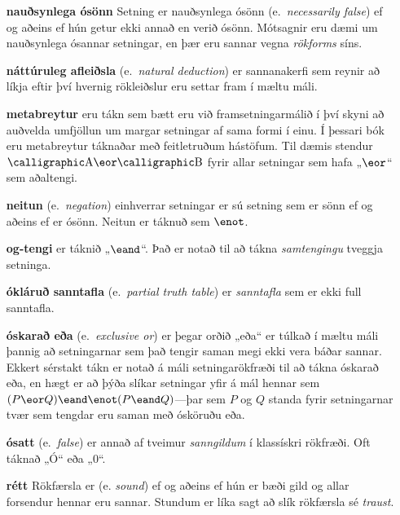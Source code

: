\begin{enumerate}[leftmargin=35pt]
	\item[\textbf{nauðsynlega ósönn}] Setning er nauðsynlega ósönn (e.\ \emph{necessarily false}) ef og aðeins ef hún getur ekki annað en verið ósönn. Mótsagnir eru dæmi um nauðsynlega ósannar setningar, en þær eru sannar vegna \emph{rökforms} síns.
	
	\item[\textbf{náttúruleg afleiðsla}] (e.\ \emph{natural deduction}) er sannanakerfi sem reynir að líkja eftir því hvernig rökleiðslur eru settar fram í mæltu máli. 
	
	\item[\textbf{metabreytur}] eru tákn sem bætt eru við framsetningarmálið í því skyni að auðvelda umfjöllun um margar setningar af sama formi í einu. Í þessari bók eru metabreytur táknaðar með feitletruðum hástöfum. Til dæmis stendur $\meta{A} \eor \meta{B}$ fyrir allar setningar sem hafa „$\eor$“ sem aðaltengi.
	
	\item[\textbf{neitun}] (e.\ \emph{negation}) einhverrar setningar  er sú setning sem er sönn ef og aðeins ef  er ósönn. Neitun  er táknuð sem $\enot$.
	
	\item[\textbf{og-tengi}] er táknið „$\eand$“. Það er notað til að tákna \emph{samtengingu} tveggja setninga.
	
	\item[\textbf{ókláruð sanntafla}] (e.\ \emph{partial truth table}) er \emph{sanntafla} sem er ekki full sanntafla.
	
	\item[\textbf{óskarað eða}] (e.\ \emph{exclusive or}) er þegar orðið „eða“ er túlkað í mæltu máli þannig að setningarnar sem það tengir saman megi ekki vera báðar sannar. Ekkert sérstakt tákn er notað á máli setningarökfræði til að tákna óskarað eða, en hægt er að þýða slíkar setningar yfir á mál hennar sem $(P \eor Q) \eand \enot(P \eand Q)$---þar sem $P$ og $Q$ standa fyrir setningarnar tvær sem tengdar eru saman með ósköruðu eða.
	
	\item[\textbf{ósatt}] (e.\ \emph{false}) er annað af tveimur \emph{sanngildum} í klassískri rökfræði. Oft táknað „Ó“ eða „0“. 
	
	\item[\textbf{rétt}] Rökfærsla er  (e. \emph{sound}) ef og aðeins ef hún er bæði gild og allar forsendur hennar eru sannar. Stundum er líka sagt að slík rökfærsla sé \emph{traust}.
	

\end{enumerate}
